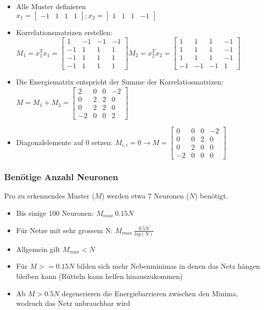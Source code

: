\begin{itemize}
	\item Alle Muster definieren\\ $x_1 = \begin{bmatrix}-1&1&1&1 \end{bmatrix};
			x_2 = \begin{bmatrix}1&1&1&-1\end{bmatrix}$
	\item Korrelationsmatrizen erstellen:\\ $M_1 = x_1^T x_1 =
		\begin{bmatrix}
			 1&-1&-1&-1 \\
			-1& 1& 1& 1 \\
			-1& 1& 1& 1 \\
			-1& 1& 1& 1
		\end{bmatrix} M_2 =x_2^T x_2 =
		\begin{bmatrix}
			 1& 1& 1&-1\\
			 1& 1& 1&-1\\
			 1& 1& 1&-1\\
			-1&-1&-1& 1
		\end{bmatrix}$
	\item Die Energiematrix entspricht der Summe der Korrelatiosmatrizen:\\
		$M = M_1 + M_2 = 
		\begin{bmatrix}
			 2&0&0&-2\\
			 0&2&2& 0\\
			 0&2&2& 0\\
			-2&0&0& 2
		\end{bmatrix}$
	\item Diagonalelemente auf 0 setzen: $M_{i,i} = 0 \rightarrow
		M=\begin{bmatrix}
			 0&0&0&-2\\
			 0&0&2& 0\\
			 0&2&0& 0\\
			-2&0&0& 0
		\end{bmatrix}$
\end{itemize}
\subsubsection{Benötige Anzahl Neuronen}
Pro zu erkennendes Muster ($M$) werden etwa 7 Neuronen ($N$) benötigt.
\begin{itemize}
	\item Bis einige 100 Neuronen: $M_{max} ~ 0.15N$
	\item Für Netze mit sehr grossem N: $M_{max} ~ \frac{0.5N}{log(N)}$
	\item Allgemein gilt $M_{max} < N$
	\item Für $M >= 0.15N$ bilden sich mehr Nebenminimas in denen das Netz
		hängen bleiben kann (Rütteln kann helfen hinauszukommen)
	\item Ab $M > 0.5N$ degenerieren die Energiebarrieren zwischen den Minima,
		wodruch das Netz unbrauchbar wird
\end{itemize}


